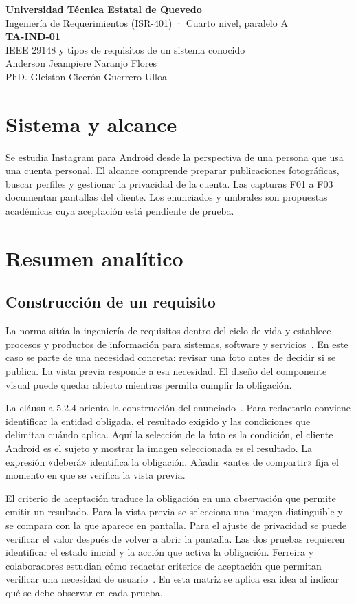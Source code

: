 \documentclass[11pt,a4paper]{article}
\begin{document}
\begin{center}
{\large\bfseries Universidad Técnica Estatal de Quevedo}\\
Ingeniería de Requerimientos (ISR-401) · Cuarto nivel, paralelo A\\[6pt]
{\Large\bfseries TA-IND-01}\\
IEEE 29148 y tipos de requisitos de un sistema conocido\\[4pt]
Anderson Jeampiere Naranjo Flores\\
PhD. Gleiston Cicerón Guerrero Ulloa
\end{center}
\section{Sistema y alcance}
Se estudia Instagram para Android desde la perspectiva de una persona que usa una cuenta personal. El alcance comprende preparar publicaciones fotográficas, buscar perfiles y gestionar la privacidad de la cuenta. Las capturas F01 a F03 documentan pantallas del cliente. Los enunciados y umbrales son propuestas académicas cuya aceptación está pendiente de prueba.
\section{Resumen analítico}
\subsection{Construcción de un requisito}
La norma sitúa la ingeniería de requisitos dentro del ciclo de vida y establece procesos y productos de información para sistemas, software y servicios~\cite[cl. 1]{iso29148}. En este caso se parte de una necesidad concreta: revisar una foto antes de decidir si se publica. La vista previa responde a esa necesidad. El diseño del componente visual puede quedar abierto mientras permita cumplir la obligación.

La cláusula 5.2.4 orienta la construcción del enunciado~\cite[cl. 5.2.4]{iso29148}. Para redactarlo conviene identificar la entidad obligada, el resultado exigido y las condiciones que delimitan cuándo aplica. Aquí la selección de la foto es la condición, el cliente Android es el sujeto y mostrar la imagen seleccionada es el resultado. La expresión «deberá» identifica la obligación. Añadir «antes de compartir» fija el momento en que se verifica la vista previa.

El criterio de aceptación traduce la obligación en una observación que permite emitir un resultado. Para la vista previa se selecciona una imagen distinguible y se compara con la que aparece en pantalla. Para el ajuste de privacidad se puede verificar el valor después de volver a abrir la pantalla. Las dos pruebas requieren identificar el estado inicial y la acción que activa la obligación. Ferreira y colaboradores estudian cómo redactar criterios de aceptación que permitan verificar una necesidad de usuario~\cite{ferreira2022}. En esta matriz se aplica esa idea al indicar qué se debe observar en cada prueba.
\end{document}
